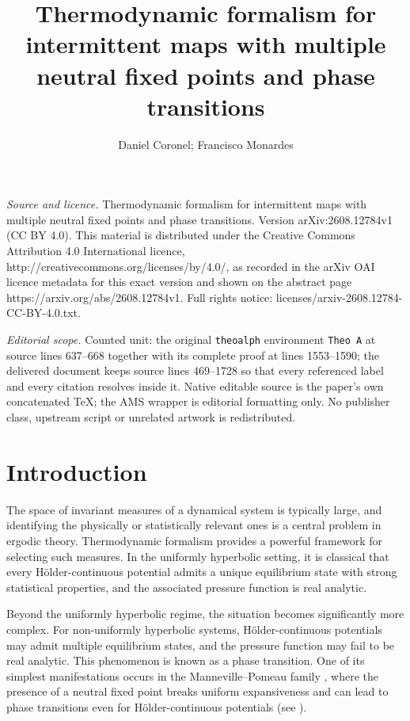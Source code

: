 \documentclass[10pt,a4paper]{amsart}
\numberwithin{equation}{section} %
\numberwithin{figure}{section} %
\renewcommand{\=}{\coloneqq}
\begin{document}
\title[Thermodynamic formalism for intermittent maps with multiple ]{Thermodynamic formalism for intermittent maps with multiple neutral fixed points and phase transitions}
\author{Daniel Coronel; Francisco Monardes}
\date{}
\maketitle
\noindent\emph{Source and licence.} Thermodynamic formalism for intermittent maps with multiple neutral fixed points and phase transitions. Version arXiv:2608.12784v1 (CC BY 4.0). This material is distributed under the Creative Commons Attribution 4.0 International licence, http://creativecommons.org/licenses/by/4.0/, as recorded in the arXiv OAI licence metadata for this exact version and shown on the abstract page https://arxiv.org/abs/2608.12784v1. Full rights notice: licenses/arxiv-2608.12784-CC-BY-4.0.txt.\par\smallskip
\noindent\textit{Editorial scope.} Counted unit: the original \texttt{theoalph} environment \texttt{Theo A} at source lines 637--668 together with its complete proof at lines 1553--1590; the delivered document keeps source lines 469--1728 so that every referenced label and every citation resolves inside it. Native editable source is the paper's own concatenated TeX; the AMS wrapper is editorial formatting only. No publisher class, upstream script or unrelated artwork is redistributed.
\section{Introduction}
\label{s:intro}
The space of invariant measures of a dynamical system is typically large, and identifying the physically or statistically relevant ones is a central problem in ergodic theory. Thermodynamic formalism provides a powerful framework for selecting such measures. In the uniformly hyperbolic setting, it is classical that every Hölder-continuous potential admits a unique equilibrium state with strong statistical properties, and the associated pressure function is real analytic.

Beyond the uniformly hyperbolic regime, the situation becomes significantly more complex. For non-uniformly hyperbolic systems, Hölder-continuous potentials may admit multiple equilibrium states, and the pressure function may fail to be real analytic. This phenomenon is known as a phase transition. One of its simplest manifestations occurs in the Manneville--Pomeau family \cite{MannevillePomeau}, where the presence of a neutral fixed point breaks uniform expansiveness and can lead to phase transitions even for Hölder-continuous potentials (see \cite{BruinTerhesiuTodd,ClimenhagaThompson,coronelRivera1,coronelRivera2,PrellbergSlawny,Sarig1}).
\end{document}
